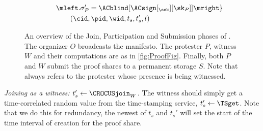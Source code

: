 \begin{figure}
\begin{minipage}{\linewidth}
\begin{align*}
        & \qquad \mleft. \sigma_P' = \ACblind[\ACsign[_{\ssk}][\sk_P]] \mright\} 
        \\
        & \qquad\qquad (\cid, \pid, \wid, t_s, t_s', l)
    \end{align*}
  \end{minipage}
  \caption{%
    An overview of the Join, Participation and Submission phases of \CROCUS.\@
    The organizer \(O\) broadcasts the manifesto.
    The protester \(P\), witness \(W\) and their computations are as in \cref{fig:ProofFig}.
    Finally, both \(P\) and \(W\) submit the proof shares to a
    permanent storage \(S\). Note that \pid always refers to the
    protester whose presence is being witnessed.
  }%
  \label{fig:ProtocolOverview}
\end{figure}

\emph{Joining as a witness: \(t_s'\gets \CROCUSjoin_W\).}
The witness should simply get a time-correlated random value from the time-stamping service, \(t_s'\gets \TSget\).
Note that we do this for redundancy, the newest of \(t_s\) and \(t_s'\) will 
set the start of the time interval of creation for the proof share.


